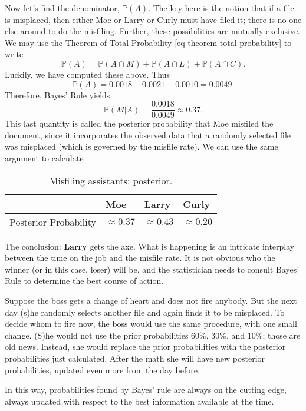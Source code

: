 Now let's find the denominator, \(\mathbb{P}(A)\). The key here is the
notion that if a file is misplaced, then either Moe or Larry or Curly
must have filed it; there is no one else around to do the
misfiling. Further, these possibilities are mutually exclusive. We may
use the Theorem of Total Probability
\eqref{eq-theorem-total-probability} to write \[
\mathbb{P}(A)=\mathbb{P}(A\cap M)+\mathbb{P}(A\cap L)+\mathbb{P}(A\cap
C).  \] Luckily, we have computed these above. Thus \[
\mathbb{P}(A)=0.0018+0.0021+0.0010=0.0049.  \] Therefore, Bayes' Rule
yields \[ \mathbb{P}(M|A)=\frac{0.0018}{0.0049}\approx0.37.  \] This
last quantity is called the posterior probability that Moe misfiled
the document, since it incorporates the observed data that a randomly
selected file was misplaced (which is governed by the misfile
rate). We can use the same argument to calculate

\begin{table}[htb]
\caption[Misfiling assistants: posterior]{Misfiling assistants: posterior.}
\centering
\begin{tabular}{llll}
 & Moe & Larry & Curly\\
\hline
Posterior Probability & \(\approx0.37\) & \(\approx0.43\) & \(\approx0.20\)\\
\end{tabular}
\end{table}

The conclusion: \textbf{Larry} gets the axe. What is happening is an
intricate interplay between the time on the job and the misfile
rate. It is not obvious who the winner (or in this case, loser) will
be, and the statistician needs to consult Bayes' Rule to determine the
best course of action.


\label{exa-misfiling-assistants-multiple} Suppose the boss gets a change
of heart and does not fire anybody. But the next day (s)he randomly
selects another file and again finds it to be misplaced. To decide
whom to fire now, the boss would use the same procedure, with one
small change. (S)he would not use the prior probabilities 60\%, 30\%,
and 10\%; those are old news. Instead, she would replace the prior
probabilities with the posterior probabilities just calculated. After
the math she will have new posterior probabilities, updated even more
from the day before.

In this way, probabilities found by Bayes' rule are always on the
cutting edge, always updated with respect to the best information
available at the time.

